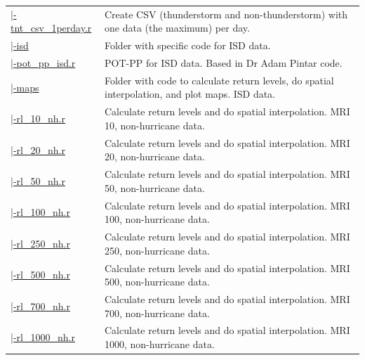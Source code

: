 \documentclass[12pt,twoside]{reedthesis}
\begin{document}
\begin{longtable}[t]{>{\raggedright\arraybackslash}p{1.3in}>{\raggedright\arraybackslash}p{4.9in}}
\href{ftp://ftp.geocorp.co/windthesis/code/pot_pp/write_t_nt_csv_one_data_per_day.r}{\;\;\;\;|-tnt\_csv\_1perday.r} & Create CSV (thunderstorm and non-thunderstorm) with one data (the maximum) per day.\\
\href{ftp://ftp.geocorp.co/windthesis/code/pot_pp/isd/}{\;\;\;\;|-isd} & Folder with specific code for ISD data.\\
\href{ftp://ftp.geocorp.co/windthesis/code/pot_pp/isd/pot_pp_isd.r}{\;\;\;\;\;\;|-pot\_pp\_isd.r} & POT-PP for ISD data. Based in Dr Adam Pintar code.\\
\href{ftp://ftp.geocorp.co/windthesis/code/pot_pp/isd/maps/}{\;\;\;\;\;\;|-maps} & Folder with code to calculate return levels, do spatial interpolation, and plot maps. ISD data.\\
\href{ftp://ftp.geocorp.co/windthesis/code/pot_pp/isd/maps/return_levels_10_nh.r}{\;\;\;\;\;\;\;\;|-rl\_10\_nh.r} & Calculate return levels and do spatial interpolation. MRI 10, non-hurricane data.\\
\href{ftp://ftp.geocorp.co/windthesis/code/pot_pp/isd/maps/return_levels_20_nh.r}{\;\;\;\;\;\;\;\;|-rl\_20\_nh.r} & Calculate return levels and do spatial interpolation. MRI 20, non-hurricane data.\\
\href{ftp://ftp.geocorp.co/windthesis/code/pot_pp/isd/maps/return_levels_50_nh.r}{\;\;\;\;\;\;\;\;|-rl\_50\_nh.r} & Calculate return levels and do spatial interpolation. MRI 50, non-hurricane data.\\
\href{ftp://ftp.geocorp.co/windthesis/code/pot_pp/isd/maps/return_levels_100_nh.r}{\;\;\;\;\;\;\;\;|-rl\_100\_nh.r} & Calculate return levels and do spatial interpolation. MRI 100, non-hurricane data.\\
\href{ftp://ftp.geocorp.co/windthesis/code/pot_pp/isd/maps/return_levels_250_nh.r}{\;\;\;\;\;\;\;\;|-rl\_250\_nh.r} & Calculate return levels and do spatial interpolation. MRI 250, non-hurricane data.\\
\href{ftp://ftp.geocorp.co/windthesis/code/pot_pp/isd/maps/return_levels_500_nh.r}{\;\;\;\;\;\;\;\;|-rl\_500\_nh.r} & Calculate return levels and do spatial interpolation. MRI 500, non-hurricane data.\\
\href{ftp://ftp.geocorp.co/windthesis/code/pot_pp/isd/maps/return_levels_700_nh.r}{\;\;\;\;\;\;\;\;|-rl\_700\_nh.r} & Calculate return levels and do spatial interpolation. MRI 700, non-hurricane data.\\
\href{ftp://ftp.geocorp.co/windthesis/code/pot_pp/isd/maps/return_levels_1000_nh.r}{\;\;\;\;\;\;\;\;|-rl\_1000\_nh.r} & Calculate return levels and do spatial interpolation. MRI 1000, non-hurricane data.\\

\end{longtable}
\end{document}
